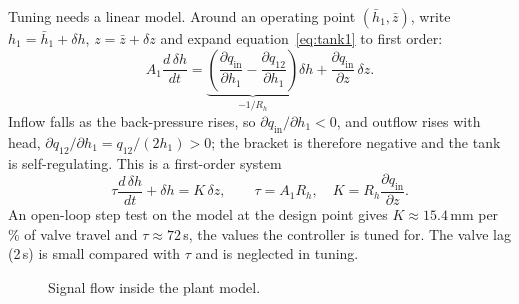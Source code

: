 Tuning needs a linear model. Around an operating point $(\bar h_1,\bar z)$,
write $h_1 = \bar h_1 + \delta h$, $z = \bar z + \delta z$ and expand
equation~\eqref{eq:tank1} to first order:
\begin{equation}
  A_1 \frac{d\,\delta h}{dt}
   = \underbrace{\left(\frac{\partial q_\text{in}}{\partial h_1}
     - \frac{\partial q_{12}}{\partial h_1}\right)}_{-1/R_h}\delta h
   + \frac{\partial q_\text{in}}{\partial z}\,\delta z .
\end{equation}
Inflow falls as the back-pressure rises, so $\partial q_\text{in}/\partial h_1<0$,
and outflow rises with head, $\partial q_{12}/\partial h_1 = q_{12}/(2h_1)>0$;
the bracket is therefore negative and the tank is self-regulating. This is a
first-order system
\begin{equation}
  \tau \frac{d\,\delta h}{dt} + \delta h = K\,\delta z,
  \qquad \tau = A_1 R_h,\quad K = R_h\frac{\partial q_\text{in}}{\partial z}.
\end{equation}
An open-loop step test on the model at the design point gives
$K \approx 15.4$\,mm per \% of valve travel and $\tau\approx 72$\,s, the
values the controller is tuned for. The valve lag (2\,s) is small compared
with $\tau$ and is neglected in tuning.

\begin{figure}[htbp]
\centering
{}
\caption{Signal flow inside the plant model.}
\label{fig:plant-signal}
\end{figure}


